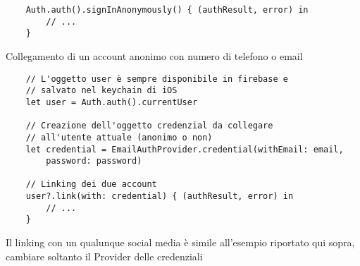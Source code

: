 \begin{verbatim}
    Auth.auth().signInAnonymously() { (authResult, error) in
        // ...
    }
\end{verbatim}

Collegamento di un account anonimo con numero di telefono o email

\begin{verbatim}
    // L'oggetto user è sempre disponibile in firebase e
    // salvato nel keychain di iOS
    let user = Auth.auth().currentUser

    // Creazione dell'oggetto credenzial da collegare
    // all'utente attuale (anonimo o non)
    let credential = EmailAuthProvider.credential(withEmail: email,
        password: password)

    // Linking dei due account
    user?.link(with: credential) { (authResult, error) in
        // ...
    }
\end{verbatim}

Il linking con un qualunque social media è simile all'esempio riportato
qui sopra, cambiare soltanto il Provider delle credenziali
